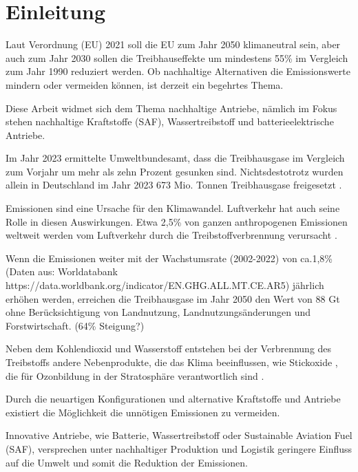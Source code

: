 \chapter{Einleitung}
\label{ch:Einleitung}

Laut Verordnung (EU) 2021 soll die EU zum Jahr 2050 klimaneutral sein, aber auch zum Jahr 2030 sollen die Treibhauseffekte um mindestens 55\%
im Vergleich zum Jahr 1990 reduziert werden. 
Ob nachhaltige Alternativen die Emissionswerte mindern oder vermeiden können, ist derzeit ein begehrtes Thema. 

Diese Arbeit widmet sich dem Thema nachhaltige Antriebe, nämlich im Fokus stehen nachhaltige Kraftstoffe (SAF), Wassertreibstoff und 
batterieelektrische Antriebe.
 
Im Jahr 2023 ermittelte Umweltbundesamt, dass die Treibhausgase im Vergleich zum Vorjahr um mehr als zehn Prozent gesunken sind.
Nichtsdestotrotz wurden allein in Deutschland im Jahr 2023 673 Mio. Tonnen Treibhausgase freigesetzt \cite{bundesregierung}.

 Emissionen sind eine Ursache für den Klimawandel. Luftverkehr hat auch seine Rolle in diesen Auswirkungen. 
Etwa 2,5\% von ganzen anthropogenen  Emissionen weltweit werden vom Luftverkehr
durch die Treibstoffverbrennung verursacht \cite{conrady2019luftverkehr}.

Wenn die Emissionen weiter mit der Wachstumsrate (2002-2022) von ca.1,8\% (Daten aus: Worldatabank https://data.worldbank.org/indicator/EN.GHG.ALL.MT.CE.AR5) 
jährlich erhöhen werden, erreichen die Treibhausgase im Jahr 2050 den Wert von 88 Gt ohne Berücksichtigung von Landnutzung, 
Landnutzungsänderungen und Forstwirtschaft. (64\% Steigung?)

Neben dem Kohlendioxid  und Wasserstoff  entstehen bei der Verbrennung des Treibstoffs andere Nebenprodukte, die 
das Klima beeinflussen, wie Stickoxide , die für Ozonbildung in der Stratosphäre verantwortlich sind \cite{conrady2019luftverkehr}.

Durch die neuartigen Konfigurationen und alternative Kraftstoffe und Antriebe existiert die Möglichkeit die unnötigen Emissionen zu vermeiden.

Innovative Antriebe, wie Batterie, Wassertreibstoff oder Sustainable Aviation Fuel (SAF), versprechen unter nachhaltiger Produktion und
Logistik geringere Einfluss auf die Umwelt und somit die Reduktion der Emissionen. 

